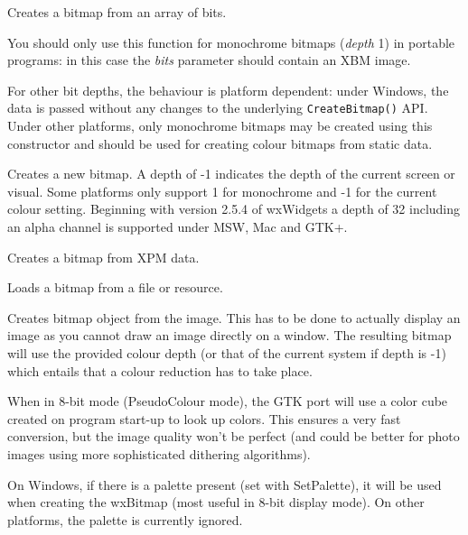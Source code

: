 Creates a bitmap from an array of bits.

You should only use this function for monochrome bitmaps ({\it depth} 1) in
portable programs: in this case the {\it bits} parameter should contain an XBM
image.

For other bit depths, the behaviour is platform dependent: under Windows, the
data is passed without any changes to the underlying {\tt CreateBitmap()} API.
Under other platforms, only monochrome bitmaps may be created using this
constructor and  should be used for creating colour
bitmaps from static data.


Creates a new bitmap. A depth of -1 indicates the depth of the current screen
or visual. Some platforms only support 1 for monochrome and -1 for the current
colour setting. Beginning with version 2.5.4 of wxWidgets a depth of 32 including
an alpha channel is supported under MSW, Mac and GTK+.


Creates a bitmap from XPM data.


Loads a bitmap from a file or resource.


Creates bitmap object from the image. This has to be done
to actually display an image as you cannot draw an image directly on a window.
The resulting bitmap will use the provided colour depth (or that of the
current system if depth is -1) which entails that a colour reduction has
to take place.

When in 8-bit mode (PseudoColour mode), the GTK port will use a color cube created
on program start-up to look up colors. This ensures a very fast conversion, but
the image quality won't be perfect (and could be better for photo images using more
sophisticated dithering algorithms).

On Windows, if there is a palette present (set with SetPalette), it will be used when
creating the wxBitmap (most useful in 8-bit display mode). On other platforms,
the palette is currently ignored.



